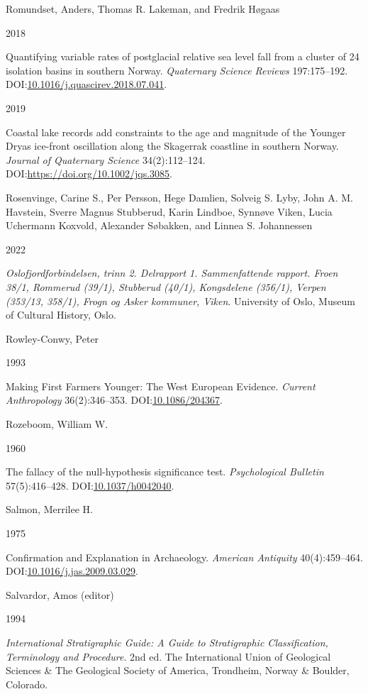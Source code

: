 \documentclass[
  12pt,
  a4paper,
  oneside]{book}
\newlength{\cslhangindent}
\newlength{\csllabelwidth}
\newlength{\cslentryspacingunit} %
\newenvironment{CSLReferences}[2] %
 {%
  \setlength{\parindent}{0pt}
  \ifodd #1
  \let\oldpar\par
  \def\par{\hangindent=\cslhangindent\oldpar}
  \fi
  \setlength{\parskip}{#2\cslentryspacingunit}
 }%
 {}
\newcommand{\CSLBlock}[1]{#1\hfill\break}
\newcommand{\CSLLeftMargin}[1]{\parbox[t]{\csllabelwidth}{#1}}
\newcommand{\CSLRightInline}[1]{\parbox[t]{\linewidth - \csllabelwidth}{#1}\break}
\begin{document}
\begin{CSLReferences}{0}{0}
\leavevmode{}%
\CSLBlock{Romundset, Anders, Thomas R. Lakeman, and Fredrik Høgaas}
\CSLLeftMargin{ 2018}
\CSLRightInline{Quantifying variable rates of postglacial relative sea level fall from a cluster of 24 isolation basins in southern Norway. \emph{Quaternary Science Reviews} 197:175--192. DOI:\href{https://doi.org/10.1016/j.quascirev.2018.07.041}{10.1016/j.quascirev.2018.07.041}.}

\leavevmode{}%
\CSLLeftMargin{ 2019 }
\CSLRightInline{Coastal lake records add constraints to the age and magnitude of the Younger Dryas ice-front oscillation along the Skagerrak coastline in southern Norway. \emph{Journal of Quaternary Science} 34(2):112--124. DOI:\url{https://doi.org/10.1002/jqs.3085}.}

\leavevmode{}%
\CSLBlock{Rosenvinge, Carine S., Per Persson, Hege Damlien, Solveig S. Lyby, John A. M. Havstein, Sverre Magnus Stubberud, Karin Lindboe, Synnøve Viken, Lucia Uchermann Koxvold, Alexander Søbakken, and Linnea S. Johannessen}
\CSLLeftMargin{ 2022}
\CSLRightInline{\emph{{Oslofjordforbindelsen, trinn 2. Delrapport 1. Sammenfattende rapport. Froen 38/1, Rommerud (39/1), Stubberud (40/1), Kongsdelene (356/1), Verpen (353/13, 358/1), Frogn og Asker kommuner, Viken}}. University of Oslo, Museum of Cultural History, Oslo.}

\leavevmode{}%
\CSLBlock{Rowley-Conwy, Peter}
\CSLLeftMargin{ 1993}
\CSLRightInline{{Making First Farmers Younger: The West European Evidence}. \emph{Current Anthropology} 36(2):346--353. DOI:\href{https://doi.org/10.1086/204367}{10.1086/204367}.}

\leavevmode{}%
\CSLBlock{Rozeboom, William W.}
\CSLLeftMargin{ 1960}
\CSLRightInline{The fallacy of the null-hypothesis significance test. \emph{Psychological Bulletin} 57(5):416--428. DOI:\href{https://doi.org/10.1037/h0042040}{10.1037/h0042040}.}

\leavevmode{}%
\CSLBlock{Salmon, Merrilee H.}
\CSLLeftMargin{ 1975}
\CSLRightInline{{Confirmation and Explanation in Archaeology}. \emph{American Antiquity} 40(4):459--464. DOI:\href{https://doi.org/10.1016/j.jas.2009.03.029}{10.1016/j.jas.2009.03.029}.}

\leavevmode{}%
\CSLBlock{Salvardor, Amos (editor)}
\CSLLeftMargin{ 1994}
\CSLRightInline{\emph{{International Stratigraphic Guide: A Guide to Stratigraphic Classification, Terminology and Procedure}}. 2nd ed. The International Union of Geological Sciences \& The Geological Society of America, Trondheim, Norway \& Boulder, Colorado.}


\end{CSLReferences}
\end{document}
